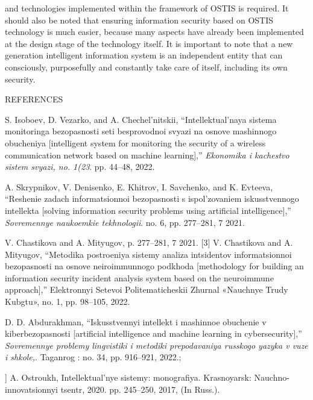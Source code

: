 \documentclass{article}
\begin{document}
\begin{multicols}{2}
and technologies implemented within the framework of
OSTIS is required. It should also be noted that ensuring
information security based on OSTIS technology is
much easier, because many aspects have already been
implemented at the design stage of the technology itself.
It is important to note that a new generation intelligent
information system is an independent entity that can
consciously, purposefully and constantly take care of
itself, including its own security.
\begin{center}
 REFERENCES
 \end{center}
\begin{itemize}
 \footnotesize{
  \renewcommand{\labelitemi}{[1]}
    \item S. Isoboev, D. Vezarko, and A. Chechel’nitskii, “Intellektual’naya
sistema monitoringa bezopasnosti seti besprovodnoi svyazi na
osnove mashinnogo obucheniya [intelligent system for monitoring
the security of a wireless communication network based on
machine learning],” 
 \textit{Ekonomika i kachestvo sistem svyazi, no.
1(23}. pp. 44–48, 2022.
\renewcommand{\labelitemi}{[2]}
    \item  A. Skrypnikov, V. Denisenko, E. Khitrov, I. Savchenko, and
K. Evteeva, “Reshenie zadach informatsionnoi bezopasnosti s
ispol’zovaniem iskusstvennogo intellekta [solving information
security problems using artificial intelligence],”  \textit{Sovremennye
naukoemkie tekhnologii}. no. 6, pp. 277–281, 7 2021.
\renewcommand{\labelitemi}{[3]}  
\item  V. Chastikova and A. Mityugov,  p. 277–281, 7 2021.
[3] V. Chastikova and A. Mityugov, “Metodika postroeniya sistemy
analiza intsidentov informatsionnoi bezopasnosti na osnove
neiroimmunnogo podkhoda [methodology for building an
information security incident analysis system based on the
neuroimmune approach],” Elektronnyi Setevoi Politematicheskii
Zhurnal «Nauchnye Trudy Kubgtu», no. 1, pp. 98–105, 2022.
\renewcommand{\labelitemi}{[4]}
\item D. D. Abdurakhman, “Iskusstvennyi intellekt i mashinnoe
obuchenie v kiberbezopasnosti [artificial intelligence and machine
learning in cybersecurity],”  \textit{Sovremennye problemy lingvistiki i
metodiki prepodavaniya russkogo yazyka v vuze i shkole,}. Taganrog : no. 34,
pp. 916–921, 2022.;
\renewcommand{\labelitemi}{[5]}
\item ] A. Ostroukh, Intellektual’nye sistemy: monografiya. Krasnoyarsk:
Nauchno-innovatsionnyi tsentr, 2020.
pp. 245–250, 2017, (In Russ.).
}
\end{itemize}
\end{multicols}
\end{document}
